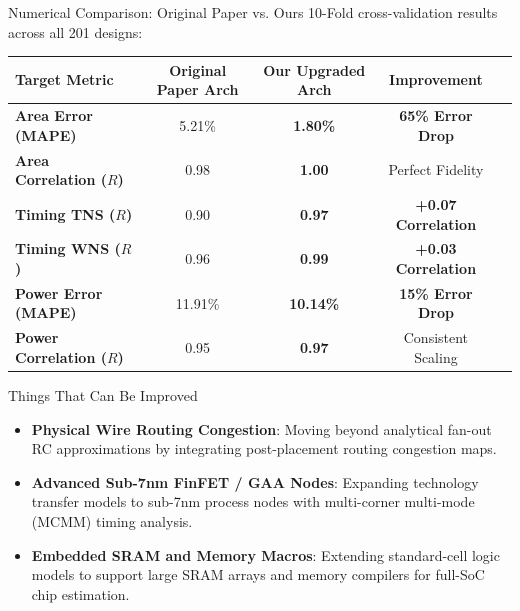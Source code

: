 \documentclass[aspectratio=169,10pt]{beamer}
\begin{document}
\begin{frame}{Numerical Comparison: Original Paper vs. Ours}
    10-Fold cross-validation results across all 201 designs:
    \vspace{0.3cm}
    \begin{table}[h]
        \centering\small
        \begin{tabular}{lcccc}
            \toprule
            \textbf{Target Metric} & \textbf{Original Paper Arch} & \textbf{Our Upgraded Arch} & \textbf{Improvement} \\
            \midrule
            \textbf{Area Error (MAPE)} & 5.21\% & \textbf{1.80\%} & \textbf{65\% Error Drop} \\
            \textbf{Area Correlation ($R$)} & 0.98 & \textbf{1.00} & Perfect Fidelity \\
            \midrule
            \textbf{Timing TNS ($R$)} & 0.90 & \textbf{0.97} & \textbf{+0.07 Correlation} \\
            \textbf{Timing WNS ($R$)} & 0.96 & \textbf{0.99} & \textbf{+0.03 Correlation} \\
            \midrule
            \textbf{Power Error (MAPE)} & 11.91\% & \textbf{10.14\%} & \textbf{15\% Error Drop} \\
            \textbf{Power Correlation ($R$)} & 0.95 & \textbf{0.97} & Consistent Scaling \\
            \bottomrule
        \end{tabular}
    \end{table}
\end{frame}

\begin{frame}{Things That Can Be Improved}
    \vspace{0.6cm}
    \begin{itemize}\setlength{\itemsep}{18pt}
        \item \textbf{Physical Wire Routing Congestion}:
        Moving beyond analytical fan-out RC approximations by integrating post-placement routing congestion maps.
        
        \item \textbf{Advanced Sub-7nm FinFET / GAA Nodes}:
        Expanding technology transfer models to sub-7nm process nodes with multi-corner multi-mode (MCMM) timing analysis.
        
        \item \textbf{Embedded SRAM and Memory Macros}:
        Extending standard-cell logic models to support large SRAM arrays and memory compilers for full-SoC chip estimation.
    \end{itemize}
\end{frame}
\end{document}
